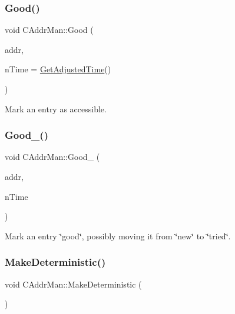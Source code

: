 \mbox{\label{class_c_addr_man_a993e80e74701d7bc6bb49880c387b847}} 
\subsubsection{\texorpdfstring{Good()}{Good()}}
{\footnotesize\ttfamily void C\+Addr\+Man\+::\+Good (\begin{DoxyParamCaption}\item[{const \mbox{\hyperlink{class_c_service}{C\+Service}} \&}]{addr,  }\item[{int64\+\_\+t}]{n\+Time = {\ttfamily \mbox{\hyperlink{timedata_8h_a09f81b9c7650f898cf3cf305b87547e6}{Get\+Adjusted\+Time}}()} }\end{DoxyParamCaption})\hspace{0.3cm}{\ttfamily [inline]}}



Mark an entry as accessible. 

\mbox{\label{class_c_addr_man_a33ec6a4584cf4b17af821e6e35216459}} 
\subsubsection{\texorpdfstring{Good\+\_\+()}{Good\_()}}
{\footnotesize\ttfamily void C\+Addr\+Man\+::\+Good\+\_\+ (\begin{DoxyParamCaption}\item[{const \mbox{\hyperlink{class_c_service}{C\+Service}} \&}]{addr,  }\item[{int64\+\_\+t}]{n\+Time }\end{DoxyParamCaption})\hspace{0.3cm}{\ttfamily [protected]}}



Mark an entry \char`\"{}good\char`\"{}, possibly moving it from \char`\"{}new\char`\"{} to \char`\"{}tried\char`\"{}. 

\mbox{\label{class_c_addr_man_a242690c5f4d2c14738da47edc5e8275c}} 
\subsubsection{\texorpdfstring{Make\+Deterministic()}{MakeDeterministic()}}
{\footnotesize\ttfamily void C\+Addr\+Man\+::\+Make\+Deterministic (\begin{DoxyParamCaption}{ }\end{DoxyParamCaption})\hspace{0.3cm}{\ttfamily [inline]}}




